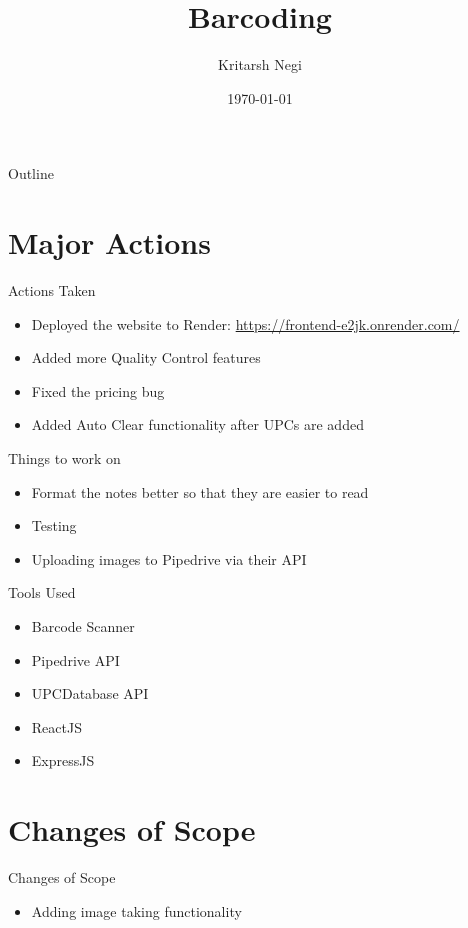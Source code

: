\documentclass[aspectratio=1610]{beamer}
\title{Barcoding}
\author{Kritarsh Negi}
\institute{The CPAP Box}
\date{\today}
\begin{document}
\begin{frame}
    \titlepage
\end{frame}

\begin{frame}{Outline}
    \tableofcontents
\end{frame}

\section{Major Actions}
\begin{frame}{Actions Taken}
    \begin{itemize}
        \item Deployed the website to Render: \url{https://frontend-e2jk.onrender.com/}
        \item Added more Quality Control features
        \item Fixed the pricing bug
        \item Added Auto Clear functionality after UPCs are added
    \end{itemize}
\end{frame}
\begin{frame}{Things to work on }
    \begin{itemize}
        \item Format the notes better so that they are easier to read
        \item Testing
        \item Uploading images to Pipedrive via their API
    \end{itemize}
\end{frame}
\begin{frame}{Tools Used}
    \begin{itemize}
        \item Barcode Scanner
        \item Pipedrive API
        \item UPCDatabase API
        \item ReactJS
        \item ExpressJS
    \end{itemize}
\end{frame}
\section{Changes of Scope}
\begin{frame}{Changes of Scope}
    \begin{itemize}
        \item Adding image taking functionality 
    \end{itemize}
\end{frame}
\end{document}
